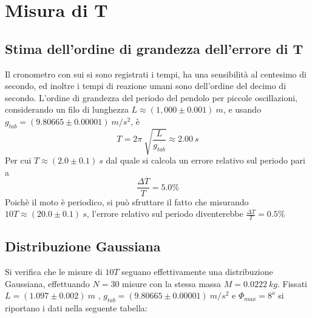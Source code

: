 \documentclass[12pt, a4paper]{article}
\begin{document}
\section{Misura di T}
\subsection{Stima dell'ordine di grandezza dell'errore di T}
Il cronometro con sui si sono registrati i tempi, ha una sensibilità al centesimo di secondo, ed inoltre i tempi di reazione umani sono dell'ordine del decimo di secondo. L'ordine di grandezza del periodo del pendolo per piccole oscillazioni, considerando un filo di lunghezza $L\approx (1,000\pm 0.001)\ m$, e usando $g_{tab}=(9.80665\pm0.00001) \ m/s^2$, è
\begin{equation*}
    T= 2\pi\ \sqrt{\frac{L}{g_{tab}}}\approx 2.00\ s
\end{equation*}
Per cui $T\approx(2.0\pm 0.1)\ s$ dal quale si calcola un errore relativo sul periodo pari a
 \begin{equation*}
     \frac{\Delta T}{T}=5.0\%
 \end{equation*}
Poichè il moto è periodico, si può sfruttare il fatto che misurando $10T\approx(20.0\pm 0.1)\ s$, l'errore relativo sul periodo diventerebbe $\displaystyle \frac{\Delta T}{T} = 0.5\% $
\newpage

\subsection{Distribuzione Gaussiana}
Si verifica che le misure di $10T$ seguano effettivamente una distribuzione Gaussiana, effettuando $N=30$ misure con la stessa massa $M=0.0222 \ kg$.
Fissati $L=(1.097\pm 0.002)\ m$ , $g_{tab}=(9.80665\pm 0.00001)\ m/s^2$ e $\Phi_{max}=8^o$ si riportano i dati nella seguente tabella: 
\end{document}
